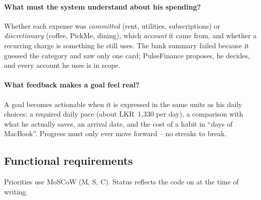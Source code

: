\documentclass[11pt,a4paper]{article}
\newcommand{\lkr}[1]{LKR~#1}
\begin{document}
\paragraph{What must the system understand about his spending?} Whether each expense was \emph{committed} (rent, utilities, subscriptions) or \emph{discretionary} (coffee, PickMe, dining), which \emph{account} it came from, and whether a recurring charge is something he still uses. The bank summary failed because it guessed the category and saw only one card; PulseFinance proposes, he decides, and every account he uses is in scope.

\paragraph{What feedback makes a goal feel real?} A goal becomes actionable when it is expressed in the same units as his daily choices: a required daily pace (about \lkr{1,330} per day), a comparison with what he actually saves, an arrival date, and the cost of a habit in ``days of MacBook''. Progress must only ever move forward -- no streaks to break.

\subsection{Functional requirements}
Priorities use MoSCoW (M, S, C). Status reflects the code on  at the time of writing.
\end{document}
